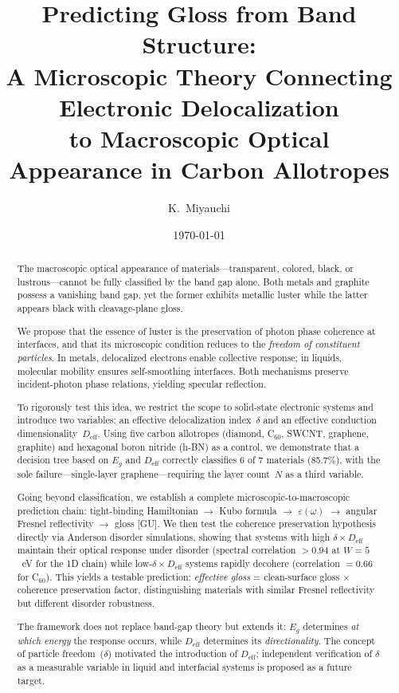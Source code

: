 \documentclass[twocolumn,showpacs,preprintnumbers,amsmath,amssymb,prb]{revtex4-2}
\begin{document}

\title{Predicting Gloss from Band Structure: \\
A Microscopic Theory Connecting Electronic Delocalization \\
to Macroscopic Optical Appearance in Carbon Allotropes}

\author{K.~Miyauchi}

\date{\today}

\begin{abstract}
The macroscopic optical appearance of materials---transparent, colored,
black, or lustrous---cannot be fully classified by the band gap alone.
Both metals and graphite possess a vanishing band gap, yet the former
exhibits metallic luster while the latter appears black with cleavage-plane
gloss.

We propose that the essence of luster is the preservation of photon phase
coherence at interfaces, and that its microscopic condition reduces to the
\emph{freedom of constituent particles}. In metals, delocalized electrons
enable collective response; in liquids, molecular mobility ensures
self-smoothing interfaces. Both mechanisms preserve incident-photon phase
relations, yielding specular reflection.

To rigorously test this idea, we restrict the scope to solid-state
electronic systems and introduce two variables: an effective delocalization
index~$\delta$ and an effective conduction dimensionality~$D_\mathrm{eff}$.
Using five carbon allotropes (diamond, C$_{60}$, SWCNT, graphene, graphite)
and hexagonal boron nitride (h-BN) as a control, we demonstrate that
a decision tree based on $E_g$ and $D_\mathrm{eff}$ correctly classifies
6 of 7 materials (85.7\%), with the sole failure---single-layer
graphene---requiring the layer count~$N$ as a third variable.

Going beyond classification, we establish a complete microscopic-to-macroscopic
prediction chain: tight-binding Hamiltonian $\to$ Kubo formula $\to$
$\varepsilon(\omega)$ $\to$ angular Fresnel reflectivity $\to$ gloss
[GU]. We then test the coherence preservation hypothesis directly via
Anderson disorder simulations, showing that systems with high
$\delta \times D_\mathrm{eff}$ maintain their optical response under
disorder (spectral correlation $>0.94$ at $W = 5$~eV for the 1D chain)
while low-$\delta \times D_\mathrm{eff}$ systems rapidly decohere
(correlation $= 0.66$ for C$_{60}$). This yields a testable prediction:
\emph{effective gloss} = clean-surface gloss $\times$ coherence
preservation factor, distinguishing materials with similar Fresnel
reflectivity but different disorder robustness.

The framework does not replace band-gap theory but extends it: $E_g$
determines \emph{at which energy} the response occurs, while
$D_\mathrm{eff}$ determines its \emph{directionality}. The concept of
particle freedom~($\delta$) motivated the introduction of
$D_\mathrm{eff}$; independent verification of $\delta$ as a measurable
variable in liquid and interfacial systems is proposed as a future
target.
\end{abstract}
\end{document}
